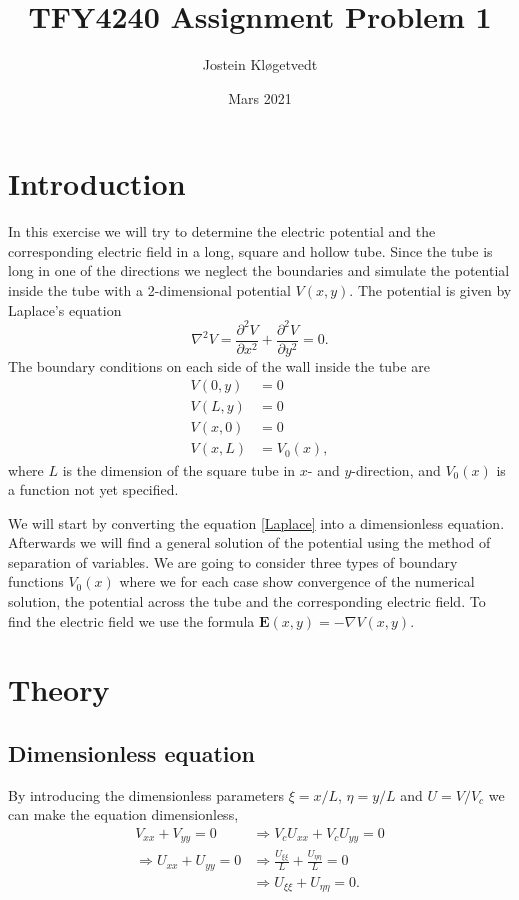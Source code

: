 \documentclass{article}
\title{TFY4240 Assignment Problem 1}
\date{Mars 2021}
\author{Jostein Kløgetvedt}
\begin{document}
\maketitle


\section*{Introduction}
In this exercise we will try to determine the electric potential and the corresponding electric field in a long, square and hollow tube. Since the tube is long in one of the directions we neglect the boundaries and simulate the potential inside the tube with a 2-dimensional potential $V(x,y)$. 
The potential is given by Laplace's equation
\begin{equation}
\label{Laplace}
    \nabla ^2V =  \frac{\partial^2V}{\partial x^2} + \frac{\partial^2V}{\partial y^2} = 0.
\end{equation}
The boundary conditions on each side of the wall inside the tube are 
\begin{equation}
    \begin{split}
        V(0,y) &= 0 \\
        V(L,y) &= 0 \\
        V(x,0) &=0 \\
        V(x,L) &= V_0(x), 
    \end{split}
\end{equation}
where $L$ is the dimension of the square tube in $x$- and $y$-direction, and $V_0(x)$ is a function not yet specified.

We will start by converting the equation \eqref{Laplace} into a dimensionless equation. Afterwards we will find a general solution of the potential using the method of separation of variables. We are going to consider three types of boundary functions $V_0(x)$ where we for each case show convergence of the numerical solution, the potential across the tube and the corresponding electric field. To find the electric field we use the formula $\boldsymbol{E}(x,y)= - \nabla V(x,y)$. 

\section*{Theory}
\subsection*{Dimensionless equation}

By introducing the dimensionless parameters $\xi = x/L$, $\eta = y/L$ and $U = V/V_c$ we can make the equation dimensionless, 
\begin{equation}
\begin{split}
    V_{xx} + V_{yy} = 0 &\Rightarrow V_cU_{xx} + V_cU_{yy} = 0 \\
    \Rightarrow U_{xx} + U_{yy} = 0 &\Rightarrow \frac{U_{\xi\xi}}{L} + \frac{U_{\eta\eta}}{L} = 0 \\ &\Rightarrow U_{\xi\xi} + U_{\eta\eta} = 0.
\end{split}  
\end{equation}
\end{document}

